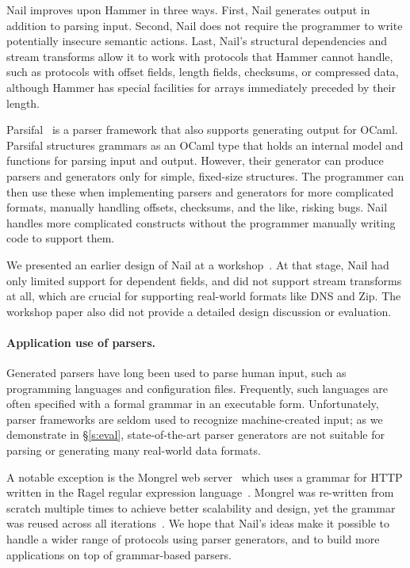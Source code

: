 Nail improves upon Hammer in three ways.  First, Nail generates output in
addition to parsing input.  Second, Nail does not require the programmer
to write potentially insecure semantic actions.  Last, Nail's structural
dependencies and stream transforms allow it to work with protocols that
Hammer cannot handle, such as protocols with offset fields, length fields,
checksums, or compressed data, although Hammer has special facilities for
arrays immediately preceded by their length.

Parsifal~\cite{ANSSI:parsifal} is a parser framework that also supports
generating output for OCaml.  Parsifal structures grammars as an OCaml
type that holds an internal model and functions for parsing input and
output.  However, their generator can produce parsers and generators
only for simple, fixed-size structures.  The programmer can then use
these when implementing parsers and generators for more complicated
formats, manually handling offsets, checksums, and the like, risking bugs.
Nail handles more complicated constructs without the programmer manually
writing code to support them.

We presented an earlier design of Nail at a
workshop~\cite{bangert:nail-langsec-anon}.  At that stage, Nail had only
limited support for dependent fields, and did not support stream
transforms at all, which are crucial for supporting real-world formats
like DNS and Zip.  The workshop paper also did not provide a detailed
design discussion or evaluation.


\paragraph{Application use of parsers.}

Generated parsers have long been used to parse human input, such
as programming languages and configuration files. Frequently, such
languages are often specified with a formal grammar in an executable
form. Unfortunately, parser frameworks are seldom used to recognize
machine-created input; as we demonstrate in \S\ref{s:eval},
state-of-the-art parser generators are not suitable for parsing or
generating many real-world data formats.

A notable exception is the Mongrel web server~\cite{mongrel} which
uses a grammar for HTTP written in the Ragel regular expression
language~\cite{ragel-paper}.  Mongrel was re-written from scratch
multiple times to achieve better scalability and design, yet the
grammar was reused across all iterations~\cite{patterson-citation}.
We hope that Nail's ideas make it possible to handle a wider range of
protocols using parser generators, and to build more applications on
top of grammar-based parsers.


